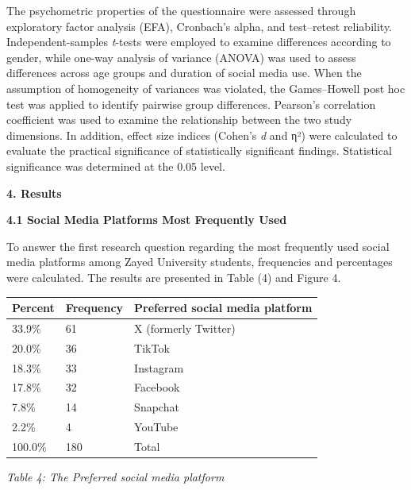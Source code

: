 \documentclass[11pt,a4paper]{article}
\begin{document}
	The psychometric properties of the questionnaire were assessed through exploratory factor analysis (EFA), Cronbach's alpha, and test--retest reliability. Independent-samples \textit{t}-tests were employed to examine differences according to gender, while one-way analysis of variance (ANOVA) was used to assess differences across age groups and duration of social media use. When the assumption of homogeneity of variances was violated, the Games--Howell post hoc test was applied to identify pairwise group differences. Pearson's correlation coefficient was used to examine the relationship between the two study dimensions. In addition, effect size indices (Cohen's \textit{d} and η²) were calculated to evaluate the practical significance of statistically significant findings. Statistical significance was determined at the 0.05 level.
	
	\textbf{4. Results}
	
	\textbf{4.1 Social Media Platforms Most Frequently Used}
	
	To answer the first research question regarding the most frequently used social media platforms among Zayed University students, frequencies and percentages were calculated. The results are presented in Table (4) and Figure 4.
	
	\begin{table}[h]
		\centering
		\begin{tabular}{|l|l|l|}
			\hline
			Percent & Frequency & Preferred social media platform \\ \hline
			33.9\% & 61 & X (formerly Twitter) \\ \hline
			20.0\% & 36 & TikTok \\ \hline
			18.3\% & 33 & Instagram \\ \hline
			17.8\% & 32 & Facebook \\ \hline
			7.8\% & 14 & Snapchat \\ \hline
			2.2\% & 4 & YouTube \\ \hline
			100.0\% & 180 & Total \\ \hline
		\end{tabular}
	\end{table}
	
	\textit{Table 4: The Preferred social media platform}
	
	\begin{figure}[h]
		\centering
	\end{figure}
	
\end{document}
